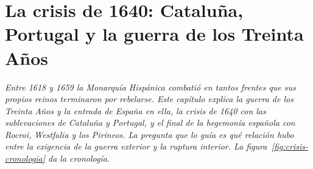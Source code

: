 \documentclass{book}
\begin{document}
\chapter{La crisis de 1640: Cataluña, Portugal y la guerra de los Treinta Años}
\label{chap:hist-11}

\noindent\textit{Entre 1618 y 1659 la Monarquía Hispánica combatió en tantos frentes que sus propios reinos terminaron por rebelarse. Este capítulo explica la guerra de los Treinta Años y la entrada de España en ella, la crisis de 1640 con las sublevaciones de Cataluña y Portugal, y el final de la hegemonía española con Rocroi, Westfalia y los Pirineos. La pregunta que lo guía es qué relación hubo entre la exigencia de la guerra exterior y la ruptura interior. La figura~\ref{fig:crisis-cronologia} da la cronología.}

\end{document}
